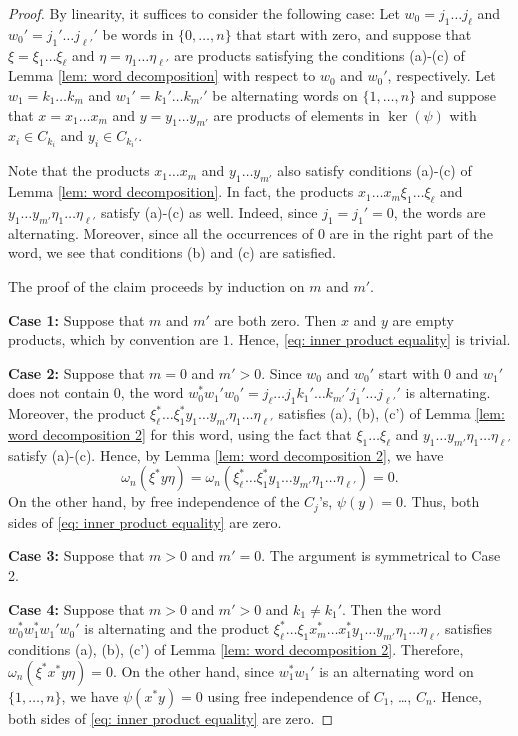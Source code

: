 \documentclass[10pt,a4paper]{amsart}
\begin{document}
\begin{proof}
By linearity, it suffices to consider the following case:  Let $w_0 = j_1 \dots j_\ell$ and $w_0' = j_1' \dots j_{\ell'}'$ be words in $\{0,\dots,n\}$ that start with zero, and suppose that $\xi = \xi_1 \dots \xi_\ell$ and $\eta = \eta_1 \dots \eta_{\ell'}$ are products satisfying the conditions (a)-(c) of Lemma \ref{lem: word decomposition} with respect to $w_0$ and $w_0'$, respectively.  Let $w_1 = k_1 \dots k_m$ and $w_1' = k_1' \dots k_{m'}'$ be alternating words on $\{1,\dots,n\}$ and suppose that $x = x_1 \dots x_m$ and $y = y_1 \dots y_{m'}$ are products of elements in $\ker(\psi)$ with $x_i \in C_{k_i}$ and $y_i \in C_{k_i'}$.

Note that the products $x_1 \dots x_m$ and $y_1 \dots y_{m'}$ also satisfy conditions (a)-(c) of Lemma \ref{lem: word decomposition}.  In fact, the products $x_1 \dots x_m \xi_1 \dots \xi_\ell$ and $y_1 \dots y_{m'} \eta_1 \dots \eta_{\ell'}$ satisfy (a)-(c) as well.  Indeed, since $j_1 = j_1' = 0$, the words are alternating.  Moreover, since all the occurrences of $0$ are in the right part of the word, we see that conditions (b) and (c) are satisfied.

The proof of the claim proceeds by induction on $m$ and $m'$.

\textbf{Case 1:} Suppose that $m$ and $m'$ are both zero.  Then $x$ and $y$ are empty products, which by convention are $1$.  Hence, \eqref{eq: inner product equality} is trivial. 

\textbf{Case 2:} Suppose that $m = 0$ and $m' > 0$.  Since $w_0$ and $w_0'$ start with $0$ and $w_1'$ does not contain $0$, the word $w_0^* w_1' w_0' = j_{\ell} \dots j_1 k_1' \dots k_{m'}' j_1' \dots j_{\ell'}'$ is alternating.  Moreover, the product $\xi_\ell^* \dots \xi_1^* y_1 \dots y_{m'} \eta_1 \dots \eta_{\ell'}$ satisfies (a), (b), (c') of Lemma \ref{lem: word decomposition 2} for this word, using the fact that $\xi_1 \dots \xi_\ell$ and $y_1 \dots y_{m'} \eta_1 \dots \eta_{\ell'}$ satisfy (a)-(c).  Hence, by Lemma \ref{lem: word decomposition 2}, we have
\[
\omega_n(\xi^* y \eta) = \omega_n(\xi_\ell^* \dots \xi_1^* y_1 \dots y_{m'} \eta_1 \dots \eta_{\ell'}) = 0.
\]
On the other hand, by free independence of the $C_j$'s, $\psi(y) = 0$.  Thus, both sides of \eqref{eq: inner product equality} are zero.

\textbf{Case 3:} Suppose that $m > 0$ and $m' = 0$.  The argument is symmetrical to Case 2.

\textbf{Case 4:} Suppose that $m > 0$ and $m' > 0$ and $k_1 \neq k_1'$.  Then the word $w_0^* w_1^* w_1' w_0'$ is alternating and the product $\xi_\ell^* \dots \xi_1 x_m^* \dots x_1^* y_1 \dots y_{m'} \eta_1 \dots \eta_{\ell'}$ satisfies conditions (a), (b), (c') of Lemma \ref{lem: word decomposition 2}. Therefore, $\omega_n(\xi^*x^*y\eta) = 0$.  On the other hand, since $w_1^*w_1'$ is an alternating word on $\{1,\dots,n\}$, we have $\psi(x^*y) = 0$ using free independence of $C_1$, \dots, $C_n$.  Hence, both sides of \eqref{eq: inner product equality} are zero.


\end{proof}
\end{document}
